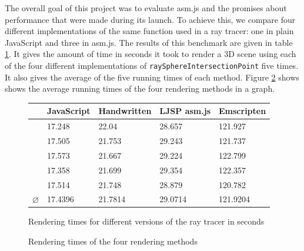 \documentclass[11pt]{report}
\begin{document}
The overall goal of this project was to evaluate asm.js and the promises about performance that were made during its launch. To achieve this, we compare four different implementations of the same function used in a ray tracer: one in plain JavaScript and three in asm.js. The results of this benchmark are given in table \ref{benchmarks}. It gives the amount of time in seconds it took to render a 3D scene using each of the four different implementations of \texttt{raySphereIntersectionPoint} five times. It also gives the average of the five running times of each method. Figure \ref{benchmarksgraph} shows shows the average running times of the four rendering methods in a graph.

\begin{figure}[ht]
\begin{center}
  \begin{tabular}{ l | l | l | l | l }
    & JavaScript & Handwritten & LJSP asm.js & Emscripten \\ \hline
    & 17.248 & 22.04 & 28.657 & 121.927 \\
    & 17.505 & 21.753 & 29.243 & 121.737 \\
    & 17.573 & 21.667 & 29.224 & 122.799 \\
    & 17.358 & 21.699 & 29.354 & 122.357 \\
    & 17.514 & 21.748 & 28.879 & 120.782 \\ \hline
    $\varnothing$ & 17.4396 & 21.7814 & 29.0714 & 121.9204 \\
  \end{tabular}
\end{center}
\caption{Rendering times for different versions of the ray tracer in seconds}
\label{benchmarks}
\end{figure}


\begin{figure}[ht]



  
  \caption{Rendering times of the four rendering methods}
  \label{benchmarksgraph}
\end{figure}
\end{document}
